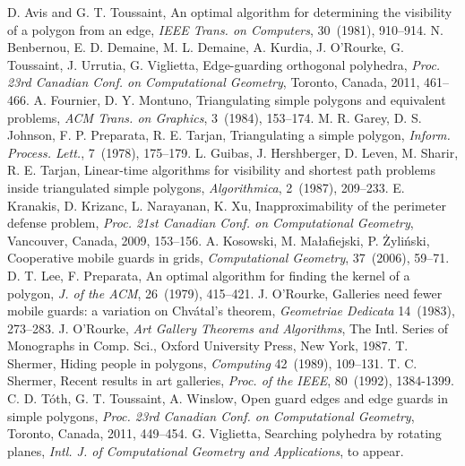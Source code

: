 \documentclass{cccg12}
\begin{document}
\begin{thebibliography}{9}
D. Avis and G. T. Toussaint,
An optimal algorithm for determining the visibility of a polygon from an edge,
\emph{IEEE Trans. on Computers}, 
30~(1981), 910--914.
N. Benbernou, E. D. Demaine, M. L. Demaine, A. Kurdia, J. O'Rourke, G. Toussaint, J. Urrutia, G. Viglietta,
Edge-guarding orthogonal polyhedra,
\emph{Proc. 23rd Canadian Conf. on Computational Geometry},
Toronto, Canada,
2011, 461--466.
A. Fournier, D. Y. Montuno,
Triangulating simple polygons and equivalent problems,
\emph{ACM Trans. on Graphics},
3~(1984), 153--174.
M. R. Garey, D. S. Johnson, F. P. Preparata, R. E. Tarjan, 
Triangulating a simple polygon,
\emph{Inform. Process. Lett.},
7~(1978), 175--179.
L. Guibas, J. Hershberger, D. Leven, M. Sharir, R. E. Tarjan,
Linear-time algorithms for visibility and shortest path problems inside triangulated simple polygons,
\emph{Algorithmica},
2~(1987), 209--233.
E. Kranakis, D. Krizanc, L. Narayanan, K. Xu,
Inapproximability of the perimeter defense problem,
\emph{Proc. 21st Canadian Conf. on Computational Geometry}, 
Vancouver, Canada, 
2009, 153--156.
A. Kosowski, M. Ma\l afiejski, P. \.{Z}yli\'{n}ski,
Cooperative mobile guards in grids,
\emph{Computational Geometry},
37~(2006), 59--71.
D. T. Lee, F. Preparata,
An optimal algorithm for finding the kernel of a polygon,
\emph{J. of the ACM},
26~(1979), 415--421.
J. O'Rourke,
Galleries need fewer mobile guards: a variation on Chv\'{a}tal's theorem,
\emph{Geometriae Dedicata}
14~(1983), 273--283.
J. O'Rourke,
\emph{Art Gallery Theorems and Algorithms},
The Intl. Series of Monographs in Comp. Sci.,
Oxford University Press, New York, 1987.
T. Shermer, 
Hiding people in polygons, 
\emph{Computing}
42~(1989), 109--131.
T. C. Shermer,
Recent results in art galleries,
\emph{Proc. of the IEEE},
80~(1992), 1384-1399.
C. D. T\'{o}th, G. T. Toussaint, A. Winslow,
Open guard edges and edge guards in simple polygons,
\emph{Proc. 23rd Canadian Conf. on Computational Geometry},
Toronto, Canada,
2011, 449--454.
G. Viglietta,
Searching polyhedra by rotating planes,
\emph{Intl. J. of Computational Geometry and Applications},
to appear.
\end{thebibliography}
\end{document}

